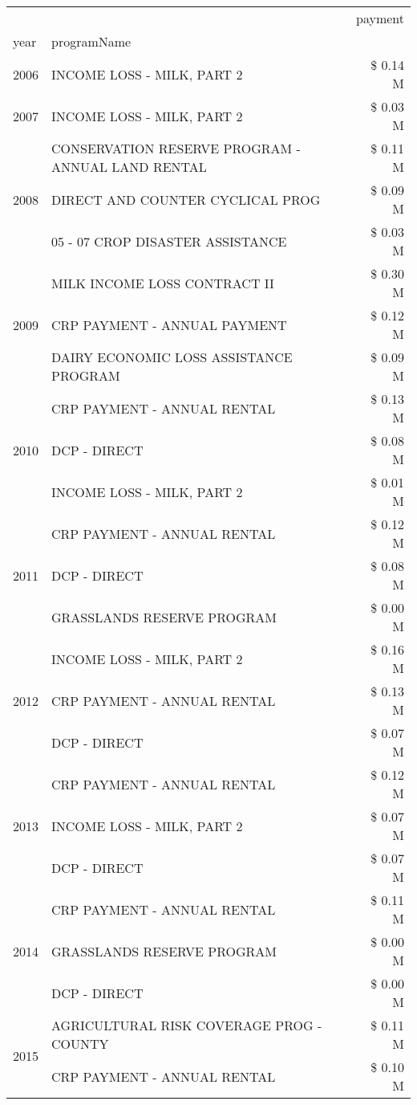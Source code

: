 \begin{tabular}{llr}
\toprule
 &  & payment \\
year & programName &  \\
\midrule
2006 & INCOME LOSS - MILK, PART 2 & \$ 0.14 M \\
\cline{1-3}
2007 & INCOME LOSS - MILK, PART 2 & \$ 0.03 M \\
\cline{1-3}
\multirow[t]{3}{*}{2008} & CONSERVATION RESERVE PROGRAM - ANNUAL LAND RENTAL & \$ 0.11 M \\
 & DIRECT AND COUNTER CYCLICAL PROG & \$ 0.09 M \\
 & 05 - 07 CROP DISASTER ASSISTANCE & \$ 0.03 M \\
\cline{1-3}
\multirow[t]{3}{*}{2009} & MILK INCOME LOSS CONTRACT II & \$ 0.30 M \\
 & CRP PAYMENT - ANNUAL PAYMENT & \$ 0.12 M \\
 & DAIRY ECONOMIC LOSS ASSISTANCE PROGRAM & \$ 0.09 M \\
\cline{1-3}
\multirow[t]{3}{*}{2010} & CRP PAYMENT - ANNUAL RENTAL & \$ 0.13 M \\
 & DCP - DIRECT & \$ 0.08 M \\
 & INCOME LOSS - MILK, PART 2 & \$ 0.01 M \\
\cline{1-3}
\multirow[t]{3}{*}{2011} & CRP PAYMENT - ANNUAL RENTAL & \$ 0.12 M \\
 & DCP - DIRECT & \$ 0.08 M \\
 & GRASSLANDS RESERVE PROGRAM & \$ 0.00 M \\
\cline{1-3}
\multirow[t]{3}{*}{2012} & INCOME LOSS - MILK, PART 2 & \$ 0.16 M \\
 & CRP PAYMENT - ANNUAL RENTAL & \$ 0.13 M \\
 & DCP - DIRECT & \$ 0.07 M \\
\cline{1-3}
\multirow[t]{3}{*}{2013} & CRP PAYMENT - ANNUAL RENTAL & \$ 0.12 M \\
 & INCOME LOSS - MILK, PART 2 & \$ 0.07 M \\
 & DCP - DIRECT & \$ 0.07 M \\
\cline{1-3}
\multirow[t]{3}{*}{2014} & CRP PAYMENT - ANNUAL RENTAL & \$ 0.11 M \\
 & GRASSLANDS RESERVE PROGRAM & \$ 0.00 M \\
 & DCP - DIRECT & \$ 0.00 M \\
\cline{1-3}
\multirow[t]{3}{*}{2015} & AGRICULTURAL RISK COVERAGE PROG - COUNTY & \$ 0.11 M \\
 & CRP PAYMENT - ANNUAL RENTAL & \$ 0.10 M \\

\end{tabular}
